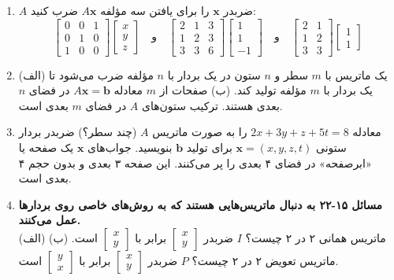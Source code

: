 \documentclass[12pt, a4paper]{book}
\begin{document}
\begin{enumerate}[label=\arabic*.]
		\item
		$A$ ضربدر $\mathbf{x}$ را برای یافتن سه مؤلفه $A\mathbf{x}$ ضرب کنید:
		\[ \begin{bmatrix} 0 & 0 & 1 \\ 0 & 1 & 0 \\ 1 & 0 & 0 \end{bmatrix} \begin{bmatrix} x \\ y \\ z \end{bmatrix} \quad \text{و} \quad \begin{bmatrix} 2 & 1 & 3 \\ 1 & 2 & 3 \\ 3 & 3 & 6 \end{bmatrix} \begin{bmatrix} 1 \\ 1 \\ -1 \end{bmatrix} \quad \text{و} \quad \begin{bmatrix} 2 & 1 \\ 1 & 2 \\ 3 & 3 \end{bmatrix} \begin{bmatrix} 1 \\ 1 \end{bmatrix} \]
		
		\item
		(الف) یک ماتریس با $m$ سطر و $n$ ستون در یک بردار با $n$ مؤلفه ضرب می‌شود تا یک بردار با $m$ مؤلفه تولید کند.
		(ب) صفحات از $m$ معادله $A\mathbf{x}=\mathbf{b}$ در فضای $n$ بعدی هستند. ترکیب ستون‌های $A$ در فضای $m$ بعدی است.
		
		\item
		معادله $2x+3y+z+5t=8$ را به صورت ماتریس $A$ (چند سطر؟) ضربدر بردار ستونی $\mathbf{x}=(x,y,z,t)$ برای تولید $\mathbf{b}$ بنویسید. جواب‌های $\mathbf{x}$ یک صفحه یا «ابرصفحه» در فضای ۴ بعدی را پر می‌کنند. این صفحه ۳ بعدی و بدون حجم ۴ بعدی است.
		
		\item
		\textbf{مسائل ۱۵-۲۲ به دنبال ماتریس‌هایی هستند که به روش‌های خاصی روی بردارها عمل می‌کنند.} \\
		(الف) ماتریس همانی ۲ در ۲ چیست؟ $I$ ضربدر $\begin{bmatrix} x \\ y \end{bmatrix}$ برابر با $\begin{bmatrix} x \\ y \end{bmatrix}$ است.
		(ب) ماتریس تعویض ۲ در ۲ چیست؟ $P$ ضربدر $\begin{bmatrix} x \\ y \end{bmatrix}$ برابر با $\begin{bmatrix} y \\ x \end{bmatrix}$ است.
		

\end{enumerate}
\end{document}
